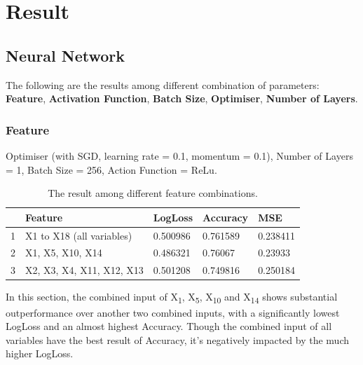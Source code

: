 \documentclass[
10pt, %
a4paper, %
oneside, %
headinclude,footinclude, %
BCOR5mm, %
]{scrartcl}
\begin{document}

\section{Result}
\subsection{Neural Network}
The following are the results among different combination of parameters: \textbf{Feature}, \textbf{Activation Function}, \textbf{Batch Size}, \textbf{Optimiser}, \textbf{Number of Layers}.
\subsubsection{Feature}
Optimiser (with SGD, learning rate = 0.1, momentum = 0.1), Number of Layers = 1, Batch Size = 256, Action Function = ReLu.
\begin{table}[H]
\centering
\caption{The result among different feature combinations.}
\label{my-label}
\begin{tabular}{|l|l|l|l|l|}
\hline
\textbf{} & \textbf{Feature} & \textbf{LogLoss} & \textbf{Accuracy} & \textbf{MSE} \\ \hline
1 & X1 to X18 (all variables) & 0.500986 & 0.761589 & 0.238411 \\ \hline
2 & X1, X5, X10, X14 & 0.486321 & 0.76067 & 0.23933 \\ \hline
3 & X2, X3, X4, X11, X12, X13 & 0.501208 & 0.749816 & 0.250184 \\ \hline
\end{tabular}
\end{table}
In this section, the combined input of X\textsubscript{1}, X\textsubscript{5}, X\textsubscript{10} and X\textsubscript{14} shows substantial outperformance over another two combined inputs, with a significantly lowest LogLoss and an almost highest Accuracy. Though the combined input of all variables have the best result of Accuracy, it's negatively impacted by the much higher LogLoss.
\end{document}
